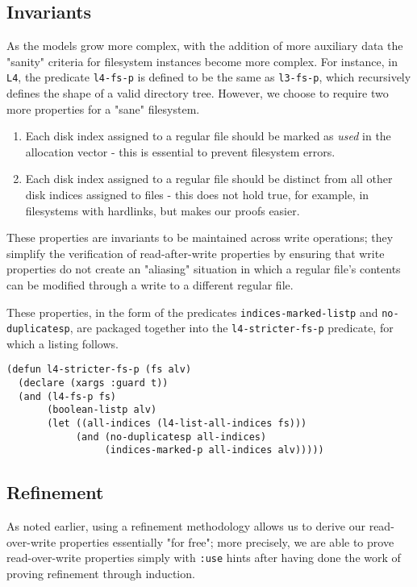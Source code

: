 \documentclass[runningheads,a4paper]{llncs}
\begin{document}
\subsection{Invariants}

As the models grow more complex, with the addition of more auxiliary
data the "sanity" criteria for filesystem instances become more
complex. For instance, in \texttt{L4}, the predicate \texttt{l4-fs-p}
is defined to be the same as \texttt{l3-fs-p}, which recursively
defines the shape of a valid directory tree. However, we choose to
require two more properties for a "sane" filesystem.

\begin{enumerate}
\item Each disk index assigned to a regular file should be
  marked as \textit{used} in the allocation vector - this is essential
  to prevent filesystem errors.
\item Each disk index assigned to a regular file should be distinct
  from all other disk indices assigned to files - this does not hold
  true, for example, in filesystems with hardlinks, but makes our
  proofs easier.
\end{enumerate}

These properties are invariants to be maintained across
write operations; they simplify the verification of read-after-write
properties by ensuring that write properties do not create an
"aliasing" situation in which a regular file's contents can be
modified through a write to a different regular file.

These properties, in the form of the predicates
\texttt{indices-marked-listp} and \texttt{no-duplicatesp}, are
packaged together into the \texttt{l4-stricter-fs-p} predicate, for
which a listing follows.

\medskip

\noindent
\begin{verbatim}
(defun l4-stricter-fs-p (fs alv)
  (declare (xargs :guard t))
  (and (l4-fs-p fs)
       (boolean-listp alv)
       (let ((all-indices (l4-list-all-indices fs)))
            (and (no-duplicatesp all-indices)
                 (indices-marked-p all-indices alv)))))
\end{verbatim}

\subsection{Refinement}

As noted earlier, using a refinement methodology allows us to derive
our read-over-write properties essentially "for free"; more precisely,
we are able to prove read-over-write properties simply with
\texttt{:use} hints after having done the work of proving refinement
through induction.
\end{document}
